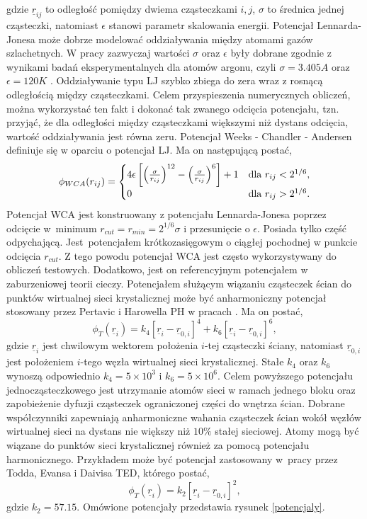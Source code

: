 \documentclass[12pt,a4paper,openright]{report} %
\begin{document}
gdzie $\underline{r}_{ij}$ to odległość pomiędzy dwiema cząsteczkami $i, j$, $\sigma$ to średnica jednej cząsteczki, natomiast $\epsilon$ stanowi parametr skalowania energii. Potencjał Lennarda-Jonesa może dobrze modelować oddziaływania między atomami gazów szlachetnych. W pracy zazwyczaj wartości $\sigma$ oraz $\epsilon$ były dobrane zgodnie z wynikami badań eksperymentalnych dla atomów argonu, czyli $\sigma = 3.405 A$ oraz $\epsilon=120 K$ \cite{Rahman}. Oddziaływanie typu LJ szybko zbiega do zera wraz z rosnącą odległością między cząsteczkami. Celem przyspieszenia numerycznych obliczeń, można wykorzystać ten fakt i dokonać tak zwanego odcięcia potencjału, tzn. przyjąć, że dla odległości między cząsteczkami większymi niż dystans odcięcia, wartość oddziaływania jest równa zeru. Potencjał {Weeks - Chandler - Andersen} definiuje się w oparciu o potencjał LJ. Ma on następującą postać,
\begin{equation}
\phi_{WCA}(r_{ij})= \begin{cases} 4 \epsilon \left[ \left( \sigma \over r_{ij} \right)^{12} - \left( \sigma \over r_{ij} \right)^{6} \right]+1 & \mbox{dla } r_{ij}<2^{1/6},  \\ 0 & \mbox{dla } r_{ij}>2^{1/6}. \end{cases}
\end{equation}
Potencjał WCA jest konstruowany z potencjału Lennarda-Jonesa poprzez odcięcie w~minimum $r_{cut}=r_{min}=2^{1/6}\sigma$ i przesunięcie o $\epsilon$. Posiada tylko część odpychającą. Jest~potencjałem krótkozasięgowym o ciągłej pochodnej w punkcie odcięcia $r_{cut}$. Z tego powodu potencjał WCA jest często wykorzystywany do obliczeń testowych. Dodatkowo, jest on referencyjnym potencjałem w zaburzeniowej teorii cieczy. 
Potencjałem służącym wiązaniu cząsteczek ścian do punktów wirtualnej sieci krystalicznej może być anharmoniczny potencjał stosowany przez Pertavic i Harowella {PH} w pracach \cite{Petravic2005, PetravicHarrowell2006}. Ma on postać,
\begin{equation}
\phi_{T}(\underline{r}_i)=k_4 [\underline{r}_i - \underline{r}_{0,i}]^4 + k_6 [\underline{r}_i - \underline{r}_{0,i}]^6,
\end{equation}
gdzie $\underline{r}_i$ jest chwilowym wektorem położenia $i$-tej cząsteczki ściany, natomiast $\underline{r}_{0,i}$ jest położeniem $i$-tego węzła wirtualnej sieci krystalicznej. Stałe $k_4$ oraz $k_6$ wynoszą odpowiednio $k_4=5 \times 10^3$ i $k_6=5 \times 10^6$. Celem powyższego potencjału jednocząsteczkowego jest utrzymanie atomów sieci w ramach jednego bloku oraz zapobieżenie dyfuzji cząsteczek ograniczonej części do wnętrza ścian. Dobrane współczynniki zapewniają anharmoniczne wahania cząsteczek ścian wokół węzłów wirtualnej sieci na dystans nie większy niż $10\%$ stałej sieciowej. Atomy mogą być wiązane do punktów sieci krystalicznej również za pomocą potencjału harmonicznego. Przykładem może być potencjał zastosowany w~pracy \cite{Todd} przez Todda, Evansa i Daivisa {TED}, którego postać,
\begin{equation}
\phi_{T}(\underline{r}_i)=k_2 [\underline{r}_i - \underline{r}_{0,i}]^2,
\end{equation}
gdzie $k_2=57.15$.
Omówione potencjały przedstawia rysunek \ref{potencjaly}. 
%
\end{document}
